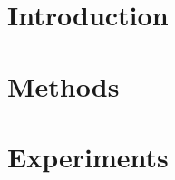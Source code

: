 \documentclass[sigconf]{acmart}
\begin{document}
\title{}



\author{Alexander Friedman}


\author{Alexandra Porter}


\author{Alexander Rickman}



\begin{abstract}

\end{abstract}


\maketitle

\section{Introduction}
\label{sec:intro}




\section{Methods}


\section{Experiments}
\label{sec:experiments}


%

%




%
\end{document}
